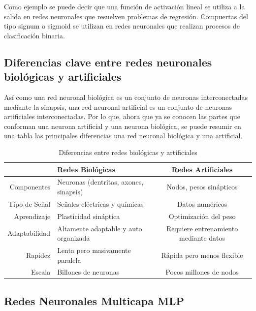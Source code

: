 Como ejemplo se puede decir que una función de activación lineal se utiliza a la salida en redes neuronales que resuelven problemas de regresión. Compuertas del tipo signum o sigmoid se utilizan en redes neuronales que realizan procesos de clasificación binaria. 



\subsection{Diferencias clave entre redes neuronales biológicas y artificiales}

Así como una red neuronal biológica es un conjunto de neuronas interconectadas mediante la sinapsis, una red neuronal artificial es un conjunto de neuronas artificiales interconectadas. Por lo que, ahora que ya se conocen las partes que conforman una neurona artificial y una neurona biológica, se puede resumir en una tabla las principales diferencias una red neuronal biológica y una artificial. 


\begin{table}[h!]
\begin{center}
\begin{tabular}{| r | l | c |}
 & Redes Biológicas & Redes Artificiales \\ \hline
Componentes & Neuronas (dentritas, axones, sinapsis) & Nodos, pesos sinápticos \\
Tipo de Señal & Señales eléctricas y químicas & Datos numéricos \\
Aprendizaje & Plasticidad sináptica & Optimización del peso  \\ 
Adaptabilidad & Altamente adaptable y auto organizada & Requiere entrenamiento mediante datos \\
Rapidez & Lenta pero masivamente paralela & Rápida pero menos flexible  \\
Escala & Billones de neuronas & Pocos millones de nodos  \\ \hline
\end{tabular}
\caption{Diferencias entre redes biológicas y artificiales}
\label{tab:fruta}
\end{center}
\end{table} 

\subsection{Redes Neuronales Multicapa MLP}

